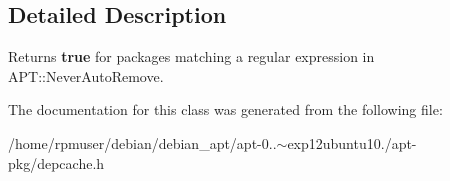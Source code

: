\subsection{\-Detailed \-Description}
\-Returns {\bfseries true} for packages matching a regular expression in \-A\-P\-T\-::\-Never\-Auto\-Remove. 

\-The documentation for this class was generated from the following file\-:\begin{DoxyCompactItemize}
\item 
/home/rpmuser/debian/debian\-\_\-apt/apt-\/0..$\sim$exp12ubuntu10./apt-\/pkg/depcache.\-h\end{DoxyCompactItemize}
